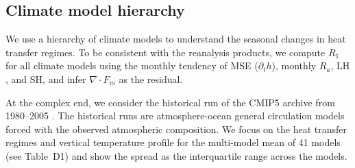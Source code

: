 \documentclass{ametsocV5}
\begin{document}
    
    
    \subsection{Climate model hierarchy}\label{subsec:models}
    We use a hierarchy of climate models to understand the seasonal changes in heat transfer regimes. To be consistent with the reanalysis products, we compute $R_1$ for all climate models using the monthly tendency of MSE ($\partial_t h$), monthly $R_a$, $\mathrm{LH}$, and $\mathrm{SH}$, and infer $\nabla\cdot F_m $ as the residual.
    
    At the complex end, we consider the historical run of the CMIP5 archive from 1980--2005 \citep{taylor2012}. The historical runs are atmosphere-ocean general circulation models forced with the observed atmospheric composition. We focus on the heat transfer regimes and vertical temperature profile for the multi-model mean of 41 models (see Table~D1) and show the spread as the interquartile range across the models.
    
\end{document}
